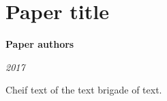 \documentclass[main_template.tex]{subfiles}
\begin{document}
\section*{Paper title}

\textbf{Paper authors}

\textit{2017}

Cheif text of the text brigade of text.
\end{document}
